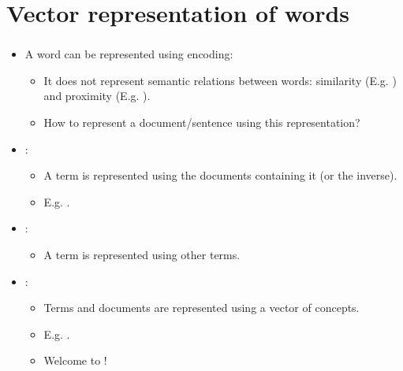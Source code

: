 \documentclass[xcolor=table]{beamer}
\begin{document}
\section{Vector representation of words}

\begin{frame}
	\frametitle{\insertshortsubtitle}
	\framesubtitle{\insertsection}

	\begin{itemize}
		\item A word can be represented using  encoding:
		\begin{itemize}
			\item It does not represent semantic relations between words: similarity (E.g. ) and proximity (E.g. ).
			\item How to represent a document/sentence using this representation?
		\end{itemize}
	
		\item {}:
		\begin{itemize}
			\item A term is represented using the documents containing it (or the inverse).
			\item E.g. .
		\end{itemize}
	
		\item {}:
		\begin{itemize}
			\item A term is represented using other terms.
		\end{itemize}
	
		\item {}:
		\begin{itemize}
			\item Terms and documents are represented using a vector of concepts.
			\item E.g. .
			\item Welcome to !
		\end{itemize}
	
	\end{itemize}

\end{frame}
\end{document}

